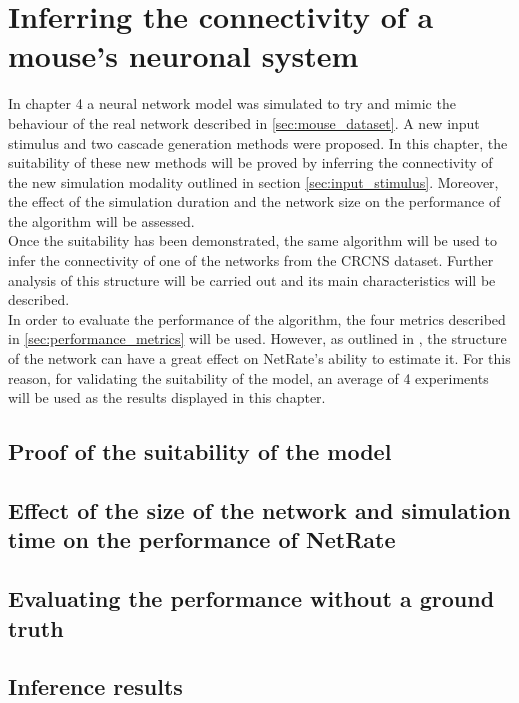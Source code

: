 
\chapter{Inferring the connectivity of a mouse's neuronal system}

In chapter 4 a neural network model was simulated to try and mimic the behaviour of the real network described in \ref{sec:mouse_dataset}. A new input stimulus and two cascade generation methods were proposed. In this chapter, the suitability of these new methods will be proved by inferring the connectivity of the new simulation modality outlined in section \ref{sec:input_stimulus}. Moreover, the effect of the simulation duration and the network size on the performance of the algorithm will be assessed.\\

Once the suitability has been demonstrated, the same algorithm will be used to infer the connectivity of one of the networks from the CRCNS dataset. Further analysis of this structure will be carried out and its main characteristics will be described.\\

In order to evaluate the performance of the algorithm, the four metrics described in \ref{sec:performance_metrics} will be used. However, as outlined in \cite{pranav_report}, the structure of the network can have a great effect on NetRate's ability to estimate it. For this reason, for validating the suitability of the model, an average of 4 experiments will be used as the results displayed in this chapter.


\section{Proof of the suitability of the model}


\section{Effect of the size of the network and simulation time on the performance of NetRate}
\section{Evaluating the performance without a ground truth}
\section{Inference results}

